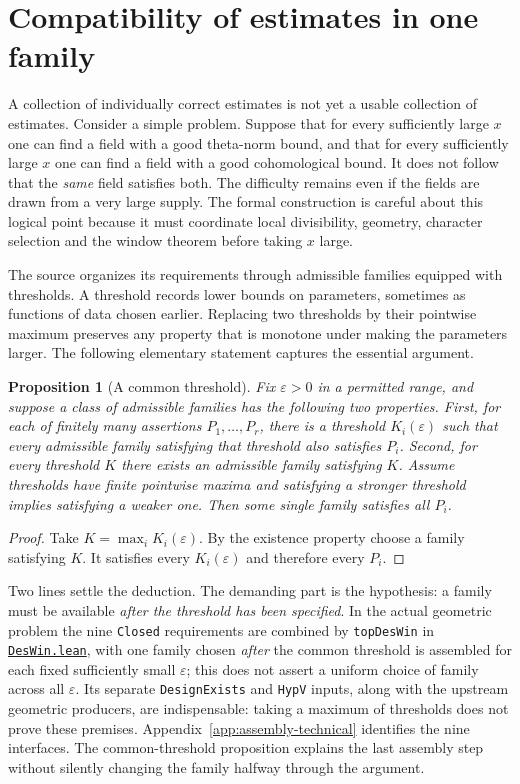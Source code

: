 \documentclass[11pt,openany,oneside]{scrbook}
\newtheorem{proposition}[theorem]{Proposition}
\theoremstyle{definition}
\theoremstyle{remark}
\newcommand{\eps}{\varepsilon}
\newcommand{\baseurl}{https://github.com/CocoSgt/riemann-hypothesis-lean/blob/7cbf7a0c32fca1badf05931879a37c3f8a2b03b4/}
\newcommand{\sourcefile}[2]{\href{\baseurl#1}{\texttt{#2}}}
\begin{document}
\section{Compatibility of estimates in one family}\label{sec:common-threshold}

A collection of individually correct estimates is not yet a usable collection of estimates.  Consider a simple problem.  Suppose that for every sufficiently large $x$ one can find a field with a good theta-norm bound, and that for every sufficiently large $x$ one can find a field with a good cohomological bound.  It does not follow that the \emph{same} field satisfies both.  The difficulty remains even if the fields are drawn from a very large supply.  The formal construction is careful about this logical point because it must coordinate local divisibility, geometry, character selection and the window theorem before taking $x$ large.

The source organizes its requirements through admissible families equipped with thresholds.  A threshold records lower bounds on parameters, sometimes as functions of data chosen earlier.  Replacing two thresholds by their pointwise maximum preserves any property that is monotone under making the parameters larger.  The following elementary statement captures the essential argument.

\begin{proposition}[A common threshold]\label{prop:common-threshold}
Fix $\eps>0$ in a permitted range, and suppose a class of admissible families has the following two properties.  First, for each of finitely many assertions $P_1,\ldots,P_r$, there is a threshold $K_i(\eps)$ such that every admissible family satisfying that threshold also satisfies $P_i$.  Second, for every threshold $K$ there exists an admissible family satisfying $K$.  Assume thresholds have finite pointwise maxima and satisfying a stronger threshold implies satisfying a weaker one.  Then some single family satisfies all $P_i$.
\end{proposition}
\begin{proof}
Take $K=\max_iK_i(\eps)$.  By the existence property choose a family satisfying $K$.  It satisfies every $K_i(\eps)$ and therefore every $P_i$.
\end{proof}

Two lines settle the deduction. The demanding part is the hypothesis: a family must be available \emph{after the threshold has been specified}. In the actual geometric problem the nine \texttt{Closed} requirements are combined by \texttt{topDesWin} in \sourcefile{src/Development/AutomorphicArithmetic/CharacterBoxes/DesWin.lean}{DesWin.lean}, with one family chosen \emph{after} the common threshold is assembled for each fixed sufficiently small $\eps$; this does not assert a uniform choice of family across all $\eps$. Its separate \texttt{DesignExists} and \texttt{HypV} inputs, along with the upstream geometric producers, are indispensable: taking a maximum of thresholds does not prove these premises. Appendix~\ref{app:assembly-technical} identifies the nine interfaces. The common-threshold proposition explains the last assembly step without silently changing the family halfway through the argument.
\end{document}
